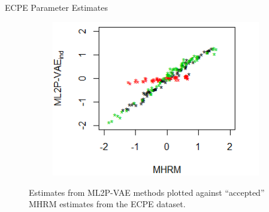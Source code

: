 \documentclass{beamer}
\theoremstyle{definition}
\begin{document}
\begin{frame}{ECPE Parameter Estimates}
\begin{figure}[h]
\begin{subfigure}{.32\textwidth}
    \end{subfigure}
    \begin{subfigure}{.32\textwidth}
      \centering
      \includegraphics[width=.9\linewidth]{../img/ml_journal_results/ecpe/vae_ind_theta_ecpe.png}
    \end{subfigure}
    \caption{Estimates from ML2P-VAE methods plotted against ``accepted'' MHRM estimates from the ECPE dataset.}
    \label{fig:ecpe_cor}
\end{figure}


\end{frame}
\end{document}
